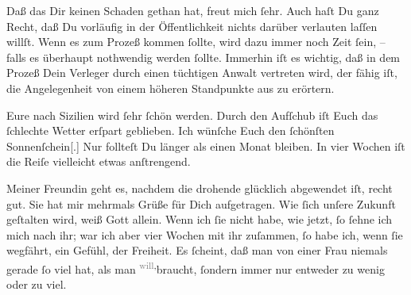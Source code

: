 \pstart
           Daß das \label{K_L03442-3v}\label{K_L03442-3} Dir keinen Schaden gethan hat, freut mich ſehr. Auch haſt Du ganz Recht, daß
               Du vorläufig in der Öffentlichkeit nichts darüber verlauten laſſen willſt. Wenn es
               zum Prozeß kommen ſollte, wird dazu immer noch Zeit ſein, – falls es überhaupt
               nothwendig werden ſollte. Immerhin iſt es wichtig, daß in dem Prozeß Dein Verleger durch einen tüchtigen Anwalt vertreten wird, der  fähig {\pb}iſt, die Angelegenheit von einem höheren Standpunkte
               aus zu erörtern.\pend
           
\pstart
           Eure\label{K_L03442-4v}\label{K_L03442-4} nach Sizilien wird ſehr ſchön werden.
               Durch den Aufſchub iſt Euch das ſchlechte Wetter erſpart geblieben. Ich wünſche Euch
               den ſchönſten Sonnenſchein{[}.{]} Nur follteſt Du länger als einen
               Monat bleiben. In vier Wochen iſt die Reiſe vielleicht etwas anſtrengend.\pend
           
\pstart
           Meiner Freundin geht es,
               nachdem \strikeout{\textcolor{gray}{d}} die drohende \label{K_L03442-5v}\label{K_L03442-5}{ } glücklich abgewendet iſt, recht gut. Sie hat mir
                   mehrmals Grüße für Dich aufgetragen. Wie
               ſich unſere Zukunft geſtalten wird, weiß Gott allein. Wenn {\pb} ich ſie nicht habe,
               wie jetzt, ſo ſehne ich mich nach ihr; war ich aber vier Wochen mit ihr zuſammen, ſo
               habe ich, wenn ſie wegfährt, ein Gefühl,  der Freiheit. Es ſcheint, daß man von einer Frau niemals gerade ſo viel hat,
               als man \substVorne{}\textsuperscript{\textcolor{gray}{will},}\substDazwischen{}braucht,\substHinten{} ſondern immer nur entweder zu wenig oder zu viel.\pend
           
